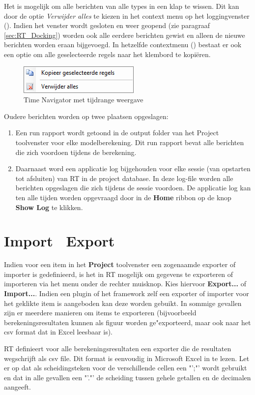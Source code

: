 Het is mogelijk om alle berichten van alle types in een klap te wissen. Dit kan door de optie \textit{Verwijder alles} te kiezen in het context menu op het loggingvenster (). Indien het venster wordt gesloten en weer geopend (zie paragraaf \ref{sec:RT_Docking}) worden ook alle eerdere berichten gewist en alleen de nieuwe berichten worden eraan bijgevoegd. In hetzelfde contextmenu () bestaat er ook een optie om alle geselecteerde regels naar het klembord te kopi\"{e}ren.

\begin{figure}[H]
	\centering
		\includegraphics{figures/chapter_general/messagesPanelContextMenu}
		\caption{Time Navigator met tijdrange weergave}
	\label{fig:general.messagesPanelContextMenu}
\end{figure}


Oudere berichten worden op twee plaatsen opgeslagen:
\begin{enumerate}
\item Een run rapport wordt getoond in de output folder van het Project toolvenster voor elke modelberekening. Dit run rapport bevat alle berichten die zich voordoen tijdens de berekening.
\item Daarnaast word een applicatie log bijgehouden voor elke sessie (van opstarten tot afsluiten) van RT in de project database. In deze log-file worden alle berichten opgeslagen die zich tijdens de sessie voordoen. De applicatie log kan ten alle tijden worden opgevraagd door in de \textbf{Home} ribbon op de knop \textbf{Show Log} te klikken.
\end{enumerate}


\section {Import \ Export}
Indien voor een item in het \textbf{Project} toolvenster een zogenaamde exporter of importer is gedefinieerd, is het in RT mogelijk om gegevens te exporteren of importeren via het menu onder de rechter muisknop. Kies hiervoor \textbf{Export...} of \textbf{Import...}. Indien een plugin of het framework zelf een exporter of importer voor het geklikte item is aangeboden kan deze worden gebuikt. In sommige gevallen zijn er meerdere manieren om items te exporteren (bijvoorbeeld berekeningsresultaten kunnen als figuur worden ge"exporteerd, maar ook naar het csv format dat in Excel leesbaar is).

RT definieert voor alle berekeningsresultaten een exporter die de resultaten wegschrijft als csv file. Dit format is eenvoudig in Microsoft Excel in te lezen. Let er op dat als scheidingsteken voor de verschillende cellen een "';"' wordt gebruikt en dat in alle gevallen een "'."'  de scheiding tussen gehele getallen en de decimalen aangeeft.